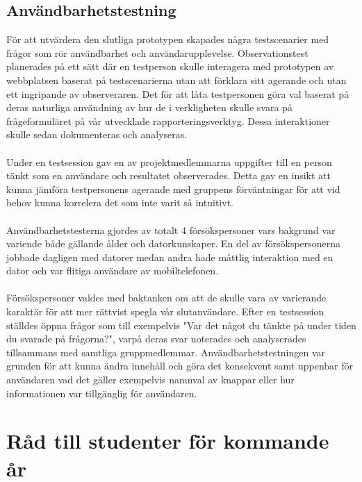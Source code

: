 \documentclass[12pt]{article}
\begin{document}
\subsection{Användbarhetstestning}
För att utvärdera den slutliga prototypen skapades några testscenarier med frågor som rör användbarhet och användarupplevelse. Observationstest planerades på ett sätt där en  testperson skulle interagera med prototypen av webbplatsen baserat på testscenarierna utan att förklara sitt agerande och utan ett ingripande av observeraren. Det för att låta testpersonen göra val baserat på deras naturliga användning av hur de i verkligheten skulle svara på frågeformuläret på vår utvecklade rapporteringsverktyg. Dessa interaktioner skulle sedan dokumenteras och  analyseras.\\\\
Under en testsession gav en av projektmedlemmarna uppgifter till en person tänkt som en användare och resultatet observerades. Detta gav en insikt att kunna jämföra testpersonens agerande med gruppens förväntningar för att vid behov kunna korrelera det som inte varit så intuitivt.\\\\
Användbarhetstesterna gjordes av totalt 4 försökspersoner vars bakgrund var variende både gällande ålder och datorkunskaper. En del av försökspersonerna jobbade dagligen med datorer medan andra hade måttlig interaktion med en dator och var flitiga användare av mobiltelefonen. \\\\
Försökspersoner valdes med baktanken om att de skulle vara av varierande karaktär för att mer rättvist spegla vår slutanvändare. Efter en testsession ställdes öppna frågor som till exempelvis "Var det något du tänkte på under tiden du svarade på frågorna?", varpå deras svar noterades och analyserades tillsammans med samtliga gruppmedlemmar. Användbarhetstestningen var grunden för att kunna ändra innehåll och göra det konsekvent samt uppenbar för användaren vad det gäller exempelvis namnval av knappar eller hur informationen var tillgänglig för användaren.

\section{Råd till studenter för kommande år}
\end{document}
